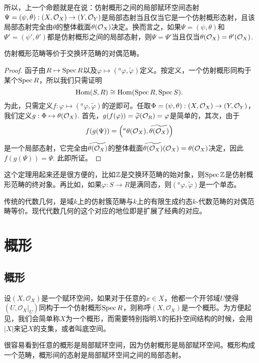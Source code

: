 所以，上一个命题就是在说：仿射概形之间的局部赋环空间态射$\Psi=(\psi,\theta):(X,\mathcal{O}_X)\to (Y,\mathcal{O}_Y)$是局部态射当且仅当它是一个仿射概形态射，且该局部态射完全由$\theta$的整体截面$\theta(\mathcal{O}_X)$决定。换而言之，如果$\Psi=(\psi,\theta)$和$\Psi'=(\psi',\theta')$都是仿射概形之间的局部态射，则$\Psi=\Psi'$当且仅当$\theta(\mathcal{O}_X)=\theta'(\mathcal{O}_X)$.

\begin{thm}
仿射概形范畴等价于交换环范畴的对偶范畴。
\end{thm}

\begin{proof}
函子由$R\mapsto \operatorname{Spec} R$以及$\varphi\mapsto ({}^a\varphi,\widetilde{\varphi})$定义。按定义，一个仿射概形同构于某个$\operatorname{Spec} R$，所以我们只需证明
\[
	\operatorname{Hom}(S,R)\cong \operatorname{Hom}(\operatorname{Spec} R,\operatorname{Spec} S).
\]
为此，只需定义$f:\varphi\mapsto ({}^a\varphi,\widetilde{\varphi})$的逆即可。任取$\Phi=(\psi,\theta):(X,\mathcal{O}_X)\to (Y,\mathcal{O}_Y)$，我们定义$g:\Phi\mapsto \theta(\mathcal{O}_X)$. 首先，$g(f(\varphi))=\widetilde{\varphi}(\mathcal{O}_R)=\varphi$是简单的，其次，由于
\[
f(g(\Psi))=\left({}^a\theta(\mathcal{O}_X),\widetilde{\theta(\mathcal{O}_X)}\right)
\]
是一个局部态射，它完全由$\widetilde{\theta(\mathcal{O}_X)}$的整体截面$\widetilde{\theta(\mathcal{O}_X)}(\mathcal{O}_X)=\theta(\mathcal{O}_X)$决定，因此$f(g(\Psi))=\Psi$. 此即所证。
\end{proof}

这个定理用起来还是很方便的，比如$\mathbb{Z}$是交换环范畴的始对象，则$\operatorname{Spec} \mathbb{Z}$是仿射概形范畴的终对象。再比如，如果$\varphi:S\to R$是满同态，则$({}^a\varphi,\widetilde{\varphi})$是一个单态。

传统的代数几何，是域$k$上的仿射簇范畴与$k$上的有限生成约态$k$-代数范畴的对偶范畴等价。现代代数几何的这个对应的地位即是扩展了经典的对应。

\chapter{概形}
\section{概形}

\begin{para}[概形]
设$(X,\mathcal{O}_X)$是一个赋环空间，如果对于任意的$x\in X$，他都一个开邻域$U$使得$(U,\mathcal{O}_X|_U)$同构于一个仿射概形$\operatorname{Spec}{R}$，则称呼$(X,\mathcal{O}_X)$是一个概形。为方便起见，我们会简单称$X$为一个概形，而需要特别指明$X$的拓扑空间结构的时候，会用$|X|$来记$X$的支集，或者叫底空间。

很容易看到任意的概形是局部赋环空间，因为仿射概形是局部赋环空间。概形构成一个范畴，概形间的态射是局部赋环空间之间的局部态射。
\end{para}

